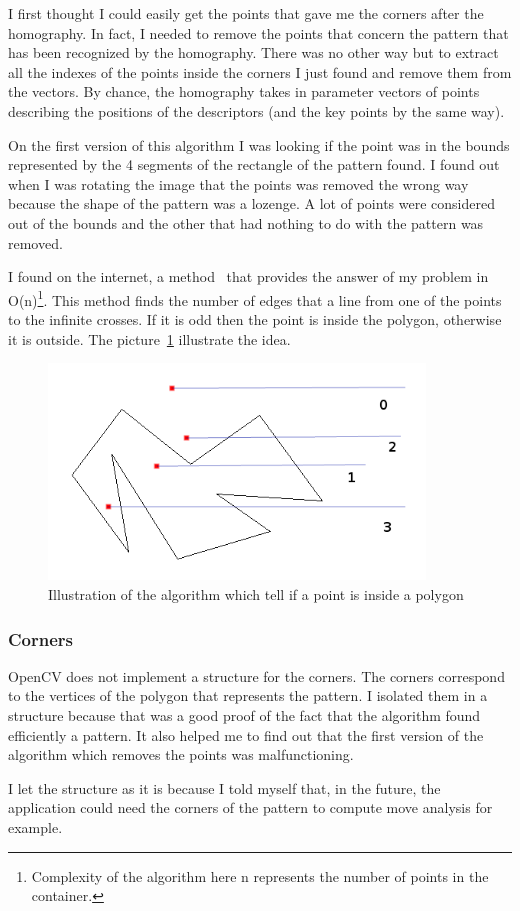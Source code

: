 	\par I first thought I could easily get the points that gave me the corners after the homography. In fact, I needed to remove the points that concern the pattern that has been recognized by the homography. There was no other way but to extract all the indexes of the points inside the corners I just found and remove them from the vectors. By chance, the homography takes in parameter vectors of points describing the positions of the descriptors (and the key points by the same way). 
	\par On the first version of this algorithm I was looking if the point was in the bounds represented by the 4 segments of the rectangle of the pattern found. I found out when I was rotating the image that the points was removed the wrong way because the shape of the pattern was a lozenge. A lot of points were considered out of the bounds and the other that had nothing to do with the pattern was removed.
	\par I found on the internet, a method~\cite{InOut} that provides the answer of my problem in O(n)\footnote{Complexity of the algorithm here n represents the number of points in the container.}. This method finds the number of edges that a line from one of the points to the infinite crosses. If it is odd then the point is inside the polygon, otherwise it is outside. The picture~\ref{OutIn} illustrate the idea.
	\begin{figure}[h]
		\begin{center}
			\includegraphics[width=10cm]{images_not_compressed/isIn.png}
			\caption{Illustration of the algorithm which tell if a point is inside a polygon}
			\label{OutIn}	
		\end{center}
	\end{figure}
	\subsubsection{Corners}
	\par OpenCV does not implement a structure for the corners. The corners correspond to the vertices of the polygon that represents the pattern. I isolated them in a structure because that was a good proof of the fact that the algorithm found efficiently a pattern. It also helped me to find out that the first version of the algorithm which removes the points was malfunctioning.
	\par I let the structure as it is because I told myself that, in the future, the application could need the corners of the pattern to compute move analysis for example. 	
	
